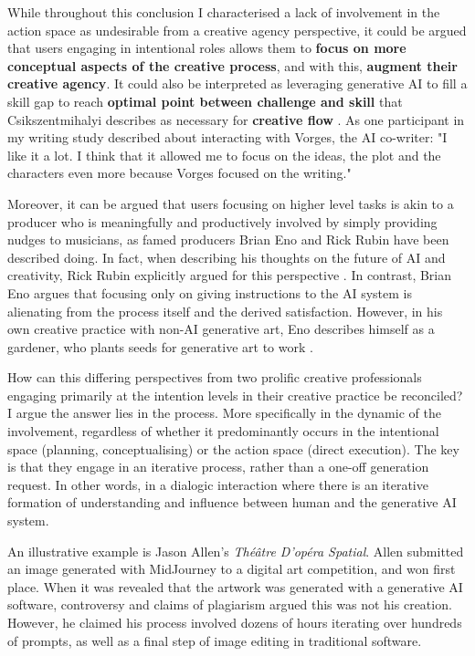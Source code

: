 While throughout this conclusion I characterised a lack of involvement in the action space as undesirable from a creative agency perspective, it could be argued that users engaging in intentional roles allows them to \textbf{focus on more conceptual aspects of the creative process}, and with this, \textbf{augment their creative agency}. It could also be interpreted as leveraging generative AI to fill a skill gap to reach \textbf{optimal point between challenge and skill} that Csikszentmihalyi describes as necessary for \textbf{creative flow} \cite{Csikszentmihalyi1997-ui}. As one participant in my writing study described about interacting with Vorges, the AI co-writer: "I like it a lot. I think that it allowed me to focus on the ideas, the plot and the characters even more because Vorges focused on the writing."

Moreover, it can be argued that users focusing on higher level tasks is akin to a producer who is meaningfully and productively involved by simply providing nudges to musicians, as famed producers Brian Eno and Rick Rubin have been described doing. In fact, when describing his thoughts on the future of AI and creativity, Rick Rubin explicitly argued for this perspective \cite{Rubin2025-sc}. In contrast, Brian Eno argues that focusing only on giving instructions to the AI system is alienating from the process itself and the derived satisfaction. However, in his own creative practice with non-AI generative art, Eno describes himself as a gardener, who plants seeds for generative art to work \cite{Eno2007-fl}. 

How can this differing perspectives from two prolific creative professionals engaging primarily at the intention levels in their creative practice be reconciled? I argue the answer lies in the process. More specifically in the dynamic of the involvement, regardless of whether it predominantly occurs in the intentional space (planning, conceptualising) or the action space (direct execution). The key is that they engage in an iterative process, rather than a one-off generation request. In other words, in a dialogic interaction where there is an iterative formation of understanding and influence between human and the generative AI system. 

An illustrative example is Jason Allen's \textit{Théâtre D'opéra Spatial}. Allen submitted an image generated with MidJourney to a digital art competition, and won first place. When it was revealed that the artwork was generated with a generative AI software, controversy and claims of plagiarism argued this was not his creation. However, he claimed his process involved dozens of hours iterating over hundreds of prompts, as well as a final step of image editing in traditional software. 

